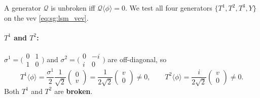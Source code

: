 \documentclass[12pt,a4paper]{article}
\begin{document}
A generator $\mathcal{Q}$ is unbroken iff $\mathcal{Q}\langle\phi\rangle = 0$. We test all four generators $\{T^1, T^2, T^3, Y\}$ on the vev \eqref{eq:sg:lsm_vev}.

\paragraph{$T^1$ and $T^2$:}
$\sigma^1 = \bigl(\begin{smallmatrix}0&1\\1&0\end{smallmatrix}\bigr)$ and $\sigma^2 = \bigl(\begin{smallmatrix}0&-i\\i&0\end{smallmatrix}\bigr)$ are off-diagonal, so
\begin{equation}
  T^1\langle\phi\rangle = \frac{\sigma^1}{2}\frac{1}{\sqrt{2}}\begin{pmatrix}0\\v\end{pmatrix}
                        = \frac{1}{2\sqrt{2}}\begin{pmatrix}v\\0\end{pmatrix} \neq 0 ,
  \qquad
  T^2\langle\phi\rangle = \frac{i}{2\sqrt{2}}\begin{pmatrix}v\\0\end{pmatrix} \neq 0 .
\end{equation}
Both $T^1$ and $T^2$ are \textbf{broken}.
\end{document}
